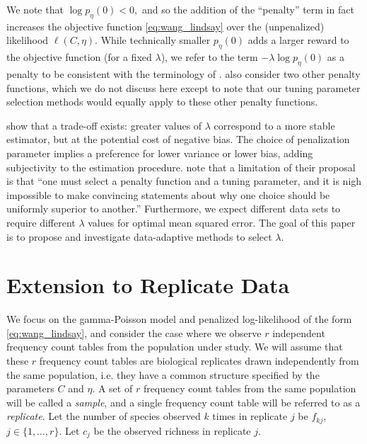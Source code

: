 \documentclass[12pt]{article}
\theoremstyle{break}
\theoremstyle{break}
\begin{document}
We note that $\log p_{\eta}(0) < 0,$ and so the addition of the ``penalty'' term in fact increases the objective function \eqref{eq:wang_lindsay} over the (unpenalized) likelihood $\ell(C,\eta)$.
While technically smaller $p_{\eta}(0)$ adds a larger reward to the objective function (for a fixed $\lambda$), we refer to the term $ - \lambda \log p_{\eta}(0)$ as a penalty
to be consistent with the terminology of \citet{wang_2005}.
\citet{wang_2005} also consider two other penalty functions, which we do not discuss here except to note that our tuning parameter selection methods would equally apply to these other penalty functions.

\citet{wang_2005} show that a trade-off exists: greater values of $\lambda$ correspond to a more stable estimator, but at the potential cost of negative bias.
The choice of penalization parameter implies a preference for lower variance or lower bias, adding subjectivity to the estimation procedure.
\citet{wang_2005} note that a limitation of their proposal is that ``one must select a penalty function and a tuning parameter, and it is nigh impossible to make convincing statements about why one choice should be uniformly superior to another.''
Furthermore, we expect different data sets to require different $\lambda$ values for optimal mean squared error.
The goal of this paper is to propose and investigate data-adaptive methods to select $\lambda$.


\section{Extension to Replicate Data}
\label{sec:fixed_lambda}

We focus on the gamma-Poisson model and penalized log-likelihood of the form \eqref{eq:wang_lindsay}, and consider the case where we observe $r$ independent frequency count tables from the population under study.
We will assume that these $r$ frequency count tables are biological replicates drawn independently from the same population, i.e. they have a common structure specified by the parameters $C$ and $\eta$.  A set of $r$ frequency count tables from the same population will be called a \textit{sample}, and a single frequency count table will be referred to as a \textit{replicate}.  Let the number of species observed $k$ times in replicate $j$ be $f_{kj}$, $j \in \{1, \dots , r\}$.  Let $c_j$ be the observed richness in replicate $j$.
\end{document}
